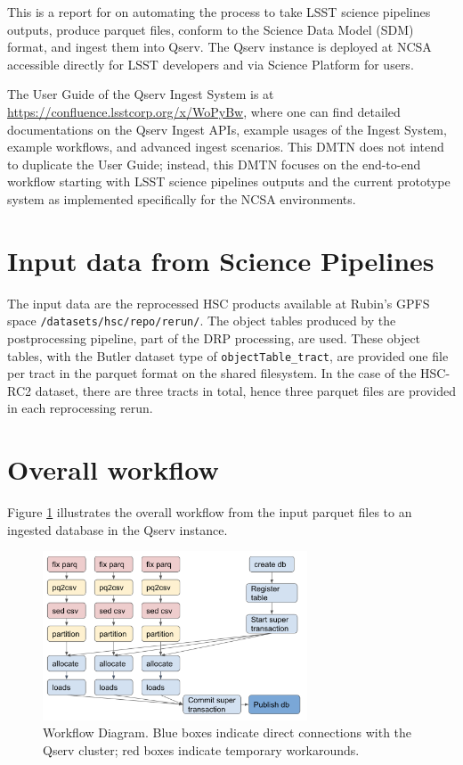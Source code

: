 This is a report for  on automating the process to take LSST science pipelines outputs, produce parquet files, conform to the Science Data Model (SDM) format, and ingest them into Qserv.
The Qserv instance is deployed at NCSA accessible directly for LSST developers and via Science Platform for users.

The User Guide of the Qserv Ingest System is at \url{https://confluence.lsstcorp.org/x/WoPyBw}, where one can find detailed documentations on the Qserv Ingest APIs, example usages of the Ingest System, example workflows, and advanced ingest scenarios.
This DMTN does not intend to duplicate the User Guide; instead, this DMTN focuses on the end-to-end workflow starting with LSST science pipelines outputs and the current prototype system as implemented specifically for the NCSA environments.

\section{Input data from Science Pipelines}
The input data are the reprocessed HSC products available at Rubin's GPFS space \texttt{/datasets/hsc/repo/rerun/}.
The object tables produced by the postprocessing pipeline, part of the DRP processing, are used.
These object tables, with the Butler dataset type of \texttt{objectTable\_tract}, are provided one file per tract in the parquet format on the shared filesystem.
In the case of the HSC-RC2 dataset, there are three tracts in total, hence three parquet files are provided in each reprocessing rerun.


\section{Overall workflow}
Figure \ref{fig:workflow} illustrates the overall workflow from the input parquet files to an ingested database in the Qserv instance.

\begin{figure}[h]
  \centering
  \includegraphics[width=0.70\textwidth]{ingest_workflow_DM27383.png}
  \caption{Workflow Diagram. Blue boxes indicate direct connections with the Qserv cluster; red boxes indicate temporary workarounds.}
  \label{fig:workflow}
\end{figure}

